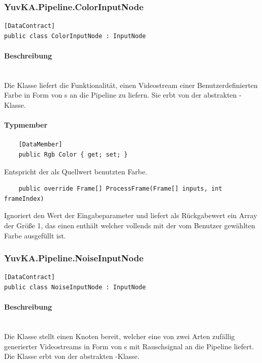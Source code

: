 \subsubsection{YuvKA.Pipeline.ColorInputNode}

\begin{verbatim}
[DataContract]
public class ColorInputNode : InputNode
\end{verbatim}

\paragraph{Beschreibung}~\\
Die Klasse  liefert die Funktionalität, einen Videostream einer Benutzerdefinierten Farbe in Form von s an die Pipeline zu liefern. Sie erbt von der abstrakten -Klasse.

\paragraph{Typmember}
\begin{itemize}

	\begin{verbatim}
	[DataMember]
	public Rgb Color { get; set; }
	\end{verbatim}
	Entspricht der als Quellwert benutzten Farbe.


	\begin{verbatim}
	public override Frame[] ProcessFrame(Frame[] inputs, int frameIndex)
	\end{verbatim}
	Ignoriert den Wert der Eingabeparameter und liefert als Rückgabewert ein Array der Größe 1, das einen  enthält welcher vollends mit der vom Benutzer gewählten Farbe ausgefüllt ist.

\end{itemize}

\subsubsection{YuvKA.Pipeline.NoiseInputNode}

\begin{verbatim}
[DataContract]
public class NoiseInputNode : InputNode
\end{verbatim}

\paragraph{Beschreibung}~\\
Die Klasse  stellt einen Knoten bereit, welcher eine von zwei Arten zufällig generierter Videostreams in Form von s mit Rauschsignal an die Pipeline liefert. Die Klasse erbt von der abstrakten -Klasse.

